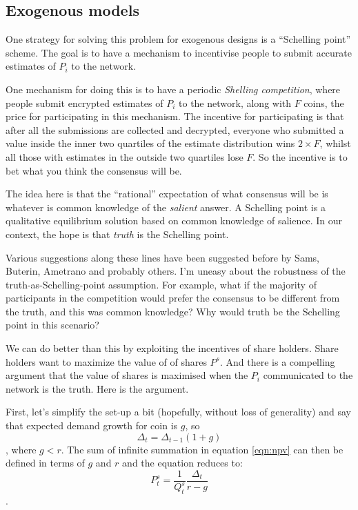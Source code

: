 \documentclass[twocolumn]{article}
\begin{document}
\subsection*{Exogenous models}
One strategy for solving this problem for exogenous designs is a
``Schelling point'' scheme. The goal is to have a mechanism to
incentivise people to submit accurate estimates of $P_{i}$ to the
network.

One mechanism for doing this is to have a periodic \emph{Shelling
  competition}, where people submit encrypted estimates of $P_{i}$ to
the network, along with $F$ coins, the price for participating in this
mechanism. The incentive for participating is that after all the
submissions are collected and decrypted, everyone who submitted a
value inside the inner two quartiles of the estimate distribution wins
$2\times F$, whilst all those with estimates in the outside two
quartiles lose $F$. So the incentive is to bet what you think the
consensus will be.

The idea here is that the ``rational'' expectation of what consensus
will be is whatever is common knowledge of the \emph{salient}
answer. A Schelling point is a qualitative equilibrium solution based
on common knowledge of salience. In our context, the hope is that
\emph{truth} is the Schelling point.

Various suggestions along these lines have been suggested before by
Sams\cite{sams}, Buterin\cite{buterin}, Ametrano\cite{ametrano} and
probably others. I'm uneasy about the robustness of the
truth-as-Schelling-point assumption. For example, what if the majority
of participants in the competition would prefer the consensus to be
different from the truth, and this was common knowledge? Why would
truth be the Schelling point in this scenario?

We can do better than this by exploiting the incentives of share
holders. Share holders want to maximize the value of of shares
$P^{s}$. And there is a compelling argument that the value of shares
is maximised when the $P_{i}$ communicated to the network is the
truth. Here is the argument.

First, let's simplify the set-up a bit (hopefully, without loss of
generality) and say that expected demand growth for coin is $g$, so 
\begin{equation}
\Delta_{t} = \Delta_{t-1} (1 + g)
\end{equation}, 
where $g < r$. The sum of infinite summation in equation \ref{eqn:npv}
can then be defined in terms of $g$ and $r$ and the equation reduces
to:
\begin{equation}
P^{s}_{t} = \frac{1}{Q^{s}_{t}}\frac{\Delta_{t}}{r-g}
\end{equation}.
\end{document}
